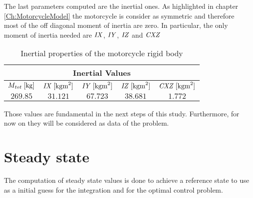 The last parameters computed are the inertial ones. As highlighted in chapter \ref{Ch:MotorcycleModel} the motorcycle is consider as symmetric and therefore most of the off diagonal moment of inertia are zero. In particular, the only moment of inertia needed are ${\it IX}$, ${\it IY}$, ${\it IZ}$ and ${\it CXZ}$

%
\begin{table}[h!]
    \centering
    \begin{tabular}{@{}ccccc@{}}
    \toprule
    \multicolumn{5}{c}{\textbf{Inertial Values}} \\ \midrule
    $M_{{\it tot}} \; [\si{\kilogram}]$ & ${\it IX} \; [\si{\kilogram\metre^2}]$ & ${\it IY} \; [\si{\kilogram\metre^2}]$ & ${\it IZ} \; [\si{\kilogram\metre^2}]$ & ${\it CXZ} \; [\si{\kilogram\metre^2}]$\\
    $269.85$ & $31.121$ & $67.723$ & $38.681$ & $1.772$\\ \bottomrule
    \end{tabular}
    \caption{Inertial properties of the motorcycle rigid body}
    \label{tab:Inertia}
\end{table}
%

Those values are fundamental in the next steps of this study. Furthermore, for now on they will be considered as data of the problem. 
%
\section{Steady state}
%
The computation of steady state values is done to achieve a reference state to use as a initial guess for the integration and for the optimal control problem. 
%
